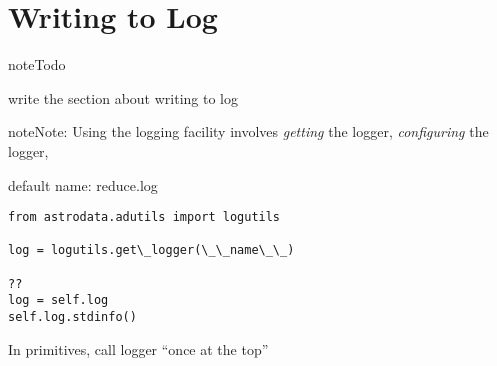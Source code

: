 \documentclass[letterpaper,10pt,english]{sphinxmanual}
\begin{document}
\section{Writing to Log}
\label{logging:writing-to-log}
\begin{notice}{note}{Todo}

write the section about writing to log
\end{notice}

\begin{notice}{note}{Note:}
Using the logging facility involves \emph{getting} the logger, \emph{configuring} the logger,


default name: reduce.log
\end{notice}

\begin{Verbatim}[commandchars=\\\{\}]
from astrodata.adutils import logutils

log = logutils.get\_logger(\_\_name\_\_)

??
log = self.log
self.log.stdinfo()
\end{Verbatim}

In primitives, call logger ``once at the top''
\end{document}
